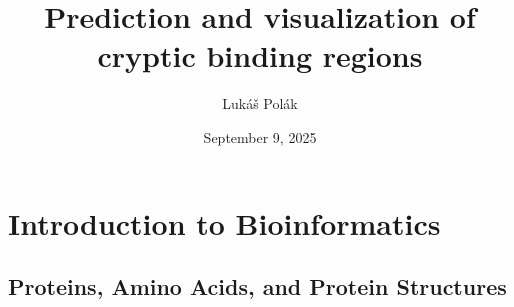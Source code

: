 \documentclass[aspectratio=169]{beamer}
\title[PredictionAndVisualization]{Prediction and visualization of cryptic binding regions}
\author[Polak L.]{Lukáš Polák}
\institute[CUNI]{Faculty of Mathematics and Physics, Charles University}
\date{September 9, 2025}
\begin{document}


\begin{frame}[plain]
  \titlepage
\end{frame}








\section{Introduction to Bioinformatics}

\subsection{Proteins, Amino Acids, and Protein Structures}
\end{document}
